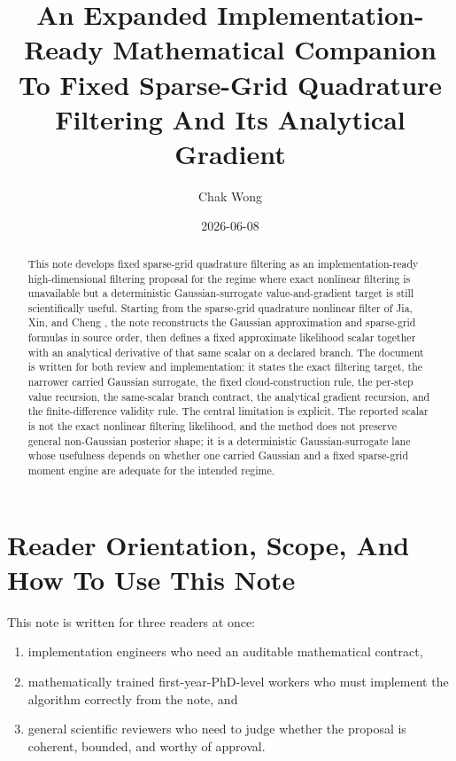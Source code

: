 \documentclass[11pt]{article}
\title{An Expanded Implementation-Ready Mathematical Companion To Fixed Sparse-Grid Quadrature Filtering And Its Analytical Gradient}
\author{Chak Wong}
\date{2026-06-08}
\numberwithin{equation}{section}
\begin{document}
\maketitle

\begin{abstract}
This note develops fixed sparse-grid quadrature filtering as an
implementation-ready high-dimensional filtering proposal for the regime where
exact nonlinear filtering is unavailable but a deterministic Gaussian-surrogate
value-and-gradient target is still scientifically useful.  Starting from the
sparse-grid quadrature nonlinear filter of Jia, Xin, and Cheng
\cite{jia2012sparsegrid}, the note reconstructs the Gaussian approximation and
sparse-grid formulas in source order, then defines a fixed approximate
likelihood scalar together with an analytical derivative of that same scalar on
a declared branch.  The document is written for both review and implementation:
it states the exact filtering target, the narrower carried Gaussian surrogate,
the fixed cloud-construction rule, the per-step value recursion, the
same-scalar branch contract, the analytical gradient recursion, and the
finite-difference validity rule.  The central limitation is explicit.  The
reported scalar is not the exact nonlinear filtering likelihood, and the method
does not preserve general non-Gaussian posterior shape; it is a deterministic
Gaussian-surrogate lane whose usefulness depends on whether one carried Gaussian
and a fixed sparse-grid moment engine are adequate for the intended regime.
\end{abstract}

\section{Reader Orientation, Scope, And How To Use This Note}
\label{sec:p33-reader-orientation}

This note is written for three readers at once:
\begin{enumerate}[leftmargin=0.28in]
  \item implementation engineers who need an auditable mathematical contract,
  \item mathematically trained first-year-PhD-level workers who must implement
  the algorithm correctly from the note, and
  \item general scientific reviewers who need to judge whether the proposal is
  coherent, bounded, and worthy of approval.
\end{enumerate}
\end{document}
